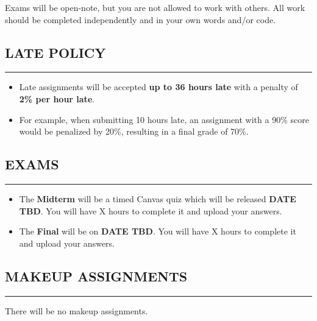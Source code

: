 Exams will be open-note, but you are not allowed to work with others. 
All work should be completed independently and in your own words and/or code.

\subsection*{LATE POLICY}
\vspace*{-0.5cm}
\rule{\textwidth}{2pt}

\begin{itemize}
    \item Late assignments will be accepted \textbf{up to 36 hours late} with a penalty of \textbf{2\% per hour late}.
    \item For example, when submitting 10 hours late, an assignment with a 90\% score would be penalized by 20\%, resulting in a final grade of 70\%.
\end{itemize}

\subsection*{EXAMS}
\vspace*{-0.5cm}
\rule{\textwidth}{2pt}
\begin{itemize}
    \item The \textbf{Midterm} will be a timed Canvas quiz which will be released \textbf{DATE TBD}. You will have X hours to complete it and upload your answers.
    \item The \textbf{Final} will be on \textbf{DATE TBD}. You will have X hours to complete it and upload your answers.
\end{itemize}

\subsection*{MAKEUP ASSIGNMENTS}
\vspace*{-0.5cm}
\rule{\textwidth}{2pt}

There will be no makeup assignments. 
